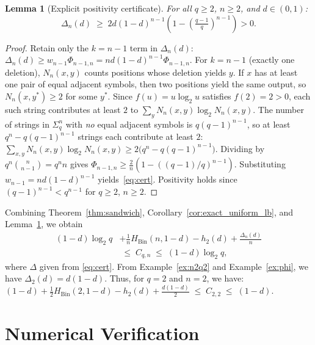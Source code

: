 \documentclass[conference]{IEEEtran}
\newtheorem{lemma}{Lemma}
\begin{document}
\begin{lemma}[Explicit positivity certificate]
\label{lem:positivity}
For all $q\ge 2$, $n\ge 2$, and $d\in(0,1)$:
\begin{equation}
  \Delta_n(d)\;\ge\;
  2d(1-d)^{n-1}\!\left(1-\!\left(\tfrac{q-1}{q}\right)^{n-1}\right)>0.
  \label{eq:cert}
\end{equation}
\end{lemma}

\begin{proof}
Retain only the $k=n-1$ term in $\Delta_n(d)$:
$\Delta_n(d)\ge w_{n-1}\Phi_{n-1,n}=nd(1-d)^{n-1}\Phi_{n-1,n}$.
For $k=n-1$ (exactly one deletion), $N_n(x,y)$ counts positions whose
deletion yields $y$.  If $x$ has at least one pair of equal adjacent
symbols, then two positions yield the same output, so $N_n(x,y^*)\ge 2$
for some $y^*$.  Since $f(u)=u\log_2 u$ satisfies $f(2)=2>0$, each
such string contributes at least $2$ to
$\sum_y N_n(x,y)\log_2 N_n(x,y)$.
The number of strings in $\Sigma_q^n$ with \emph{no} equal adjacent
symbols is $q(q-1)^{n-1}$, so at least $q^n-q(q-1)^{n-1}$ strings
each contribute at least $2$:
\(
\sum_{x,y}N_n(x,y)\log_2 N_n(x,y)\ge 2\bigl(q^n-q(q-1)^{n-1}\bigr).
\)
Dividing by $q^n\binom{n}{n-1}=q^n n$ gives
$\Phi_{n-1,n}\ge\frac{2}{n}(1-(({q-1})/{q})^{n-1})$.
Substituting $w_{n-1}=nd(1-d)^{n-1}$ yields~\eqref{eq:cert}.
Positivity holds since $(q-1)^{n-1}<q^{n-1}$ for $q\ge 2$, $n\ge 2$.
\end{proof}


Combining Theorem~\ref{thm:sandwich}, Corollary~\ref{cor:exact_uniform_lb},
and Lemma~\ref{lem:positivity}, we obtain
\begin{align}
  (1-d)\log_2 q &
  + \frac{1}{n}H_{\mathrm{Bin}}(n,1-d)
  - h_2(d)
  + \frac{\Delta_n(d)}{n} \nonumber \\
  &\;\le\; C_{q,n}\;\le\;
  (1-d)\log_2 q,
  \label{eq:full_sandwich1}
\end{align}
where \(\Delta\) given from \eqref{eq:cert}.
From Example~\ref{ex:n2q2} and Example~\ref{ex:phi}, we have
\(\Delta_2(d)=d(1-d)\). Thus, for \(q=2\) and \(n=2\), we have:
\(
(1-d)+\frac{1}{2}H_{\mathrm{Bin}}(2,1-d)-h_2(d)+\frac{d(1-d)}{2}
\;\le\; C_{2,2}\;\le\;(1-d).
\)








\section{Numerical Verification}
\label{sec:numerical}
\end{document}
